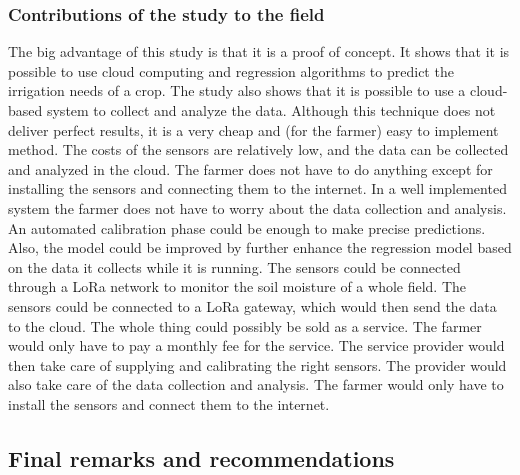 \documentclass[11pt]{scrartcl} %
\begin{document}
\subsubsection{Contributions of the study to the field}
The big advantage of this study is that it is a proof of concept. It shows that it is possible to use cloud computing and regression algorithms to predict the irrigation needs of a crop. The study also shows that it is possible to use a cloud-based system to collect and analyze the data.
\newline Although this technique does not deliver perfect results, it is a very cheap and (for the farmer) easy to implement method. The costs of the sensors are relatively low, and the data can be collected and analyzed in the cloud. The farmer does not have to do anything except for installing the sensors and connecting them to the internet. In a well implemented system the farmer does not have to worry about the data collection and analysis. An automated calibration phase could be enough to make precise predictions. Also, the model could be improved by further enhance the regression model based on the data it collects while it is running.
\newline The sensors could be connected through a LoRa network to monitor the soil moisture of a whole field. The sensors could be connected to a LoRa gateway, which would then send the data to the cloud.
\newline The whole thing could possibly be sold as a service. The farmer would only have to pay a monthly fee for the service. The service provider would then take care of supplying and calibrating the right sensors. The provider would also take care of the data collection and analysis. The farmer would only have to install the sensors and connect them to the internet.
\subsection{Final remarks and recommendations}


\newpage
\printbibliography[title=References]
\end{document}
